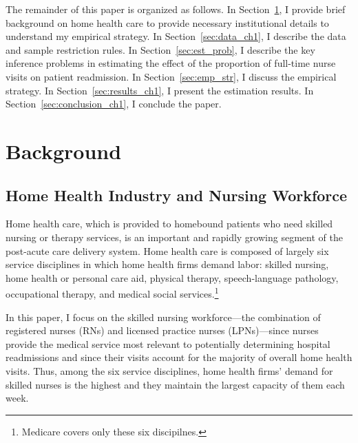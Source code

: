 \documentclass[final,12pt]{article}
\begin{document}
The remainder of this paper is organized as follows.
In Section~\ref{sec:background_ch1}, I provide brief background on home health care to provide necessary institutional details to understand my empirical strategy.  %
In Section~\ref{sec:data_ch1}, I describe the data and sample restriction rules.
In Section~\ref{sec:est_prob}, I describe the key inference problems in estimating the effect of the proportion of full-time nurse visits on patient readmission.
In Section~\ref{sec:emp_str}, I discuss the empirical strategy.
In Section~\ref{sec:results_ch1}, I present the estimation results.
In Section~\ref{sec:conclusion_ch1}, I conclude the paper.


\section{Background} \label{sec:background_ch1}

\subsection{Home Health Industry and Nursing Workforce} \label{sec:bg_hh_nurse}

Home health care, which is provided to homebound patients who need skilled nursing or therapy services, is an important and rapidly growing segment of the post-acute care delivery system.
Home health care is composed of largely six service disciplines in which home health firms demand labor: skilled nursing, home health or personal care aid, physical therapy, speech-language pathology, occupational therapy, and medical social services.\footnote{Medicare covers only these six discipilnes.}

In this paper, I focus on the skilled nursing workforce---the combination of registered nurses (RNs) and licensed practice nurses (LPNs)---since nurses provide the medical service most relevant to potentially determining hospital readmissions and since their visits account for the majority of overall home health visits.
Thus, among the six service disciplines, home health firms' demand for skilled nurses is the highest and they maintain the largest capacity of them each week.
\end{document}
